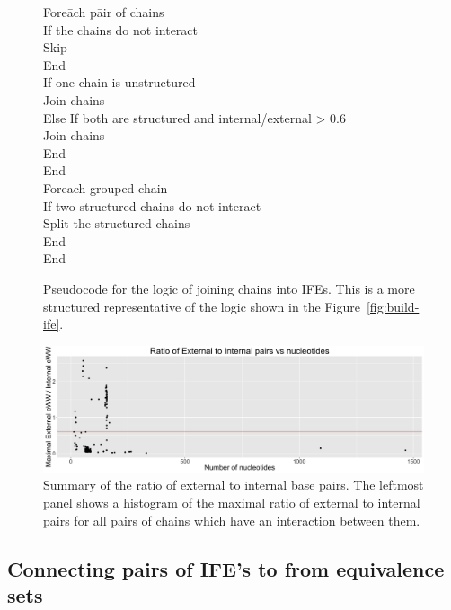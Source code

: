 \begin{figure}
  \begin{tabbing}
    Fore\=ach p\=air of chains \\
      \>If the chains do not interact \\
      \>\>Skip \\
      \>End \\
      \>If one chain is unstructured \\
      \>\>Join chains \\
      \>Else If both are structured and internal/external > 0.6 \\
      \>\>Join chains \\
      \>End \\
    End \\
    Foreach grouped chain \\
    \>If two structured chains do not interact \\
    \>\>Split the structured chains \\
    \>End \\
    End
  \end{tabbing}
  \caption{Pseudocode for the logic of joining chains into IFEs. This is a more
  structured representative of the logic shown in the Figure~\ref{fig:build-ife}.
  }
\label{fig:pseudo-ife-building}
\end{figure}

\begin{figure}
  \includegraphics[width=\linewidth]{chapter-3/figs/internal-external}
  \caption{Summary of the ratio of external to internal base pairs. The leftmost
    panel shows a histogram of the maximal ratio of external to internal pairs
  for all pairs of chains which have an interaction between them. }
\label{fig:ext-vs-int}
\end{figure}

\subsection{Connecting pairs of IFE's to from equivalence sets}

